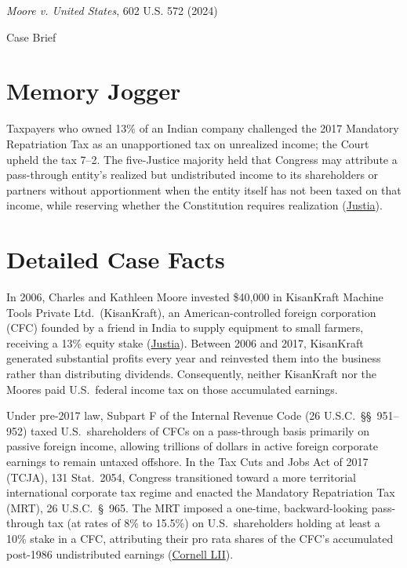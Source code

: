 \documentclass[12pt]{article}
\begin{document}
\begin{center}
{\LARGE \textit{Moore v. United States}, 602 U.S. 572 (2024)\par}
\vspace{0.8em}
{\large Case Brief\par}
\end{center}
\vspace{1em}

\section{Memory Jogger}
Taxpayers who owned 13\% of an Indian company challenged the 2017 Mandatory Repatriation Tax as an unapportioned tax on unrealized income; the Court upheld the tax 7--2. The five-Justice majority held that Congress may attribute a pass-through entity's realized but undistributed income to its shareholders or partners without apportionment when the entity itself has not been taxed on that income, while reserving whether the Constitution requires realization (\href{https://supreme.justia.com/cases/federal/us/602/22-800/}{Justia}).

\section{Detailed Case Facts}
In 2006, Charles and Kathleen Moore invested \$40,000 in KisanKraft Machine Tools Private Ltd.\ (KisanKraft), an American-controlled foreign corporation (CFC) founded by a friend in India to supply equipment to small farmers, receiving a 13\% equity stake (\href{https://supreme.justia.com/cases/federal/us/602/22-800/}{Justia}). Between 2006 and 2017, KisanKraft generated substantial profits every year and reinvested them into the business rather than distributing dividends. Consequently, neither KisanKraft nor the Moores paid U.S.\ federal income tax on those accumulated earnings.

Under pre-2017 law, Subpart F of the Internal Revenue Code (26 U.S.C.\ \S\S\ 951--952) taxed U.S.\ shareholders of CFCs on a pass-through basis primarily on passive foreign income, allowing trillions of dollars in active foreign corporate earnings to remain untaxed offshore. In the Tax Cuts and Jobs Act of 2017 (TCJA), 131 Stat.\ 2054, Congress transitioned toward a more territorial international corporate tax regime and enacted the Mandatory Repatriation Tax (MRT), 26 U.S.C.\ \S\ 965. The MRT imposed a one-time, backward-looking pass-through tax (at rates of 8\% to 15.5\%) on U.S.\ shareholders holding at least a 10\% stake in a CFC, attributing their pro rata shares of the CFC's accumulated post-1986 undistributed earnings (\href{https://www.law.cornell.edu/supremecourt/text/22-800_2024-06-20}{Cornell LII}).
\end{document}
